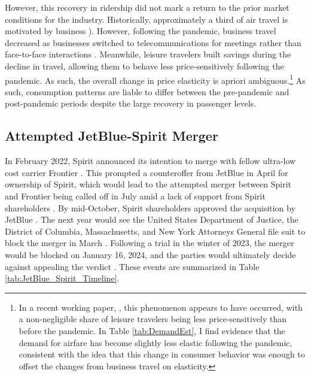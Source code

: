 \documentclass{article}
\begin{document}
	However, this recovery in ridership did not mark a return to the prior market conditions for the industry. Historically, approximately a third of air travel is motivated by business \citep{berry_tracing_2010, bet_market_2021}). However, following the pandemic, business travel decreased as businesses switched to telecommunications for meetings rather than face-to-face interactions \citep{semuels_business_2021}. Meanwhile, leisure travelers built savings during the decline in travel, allowing them to behave less price-sensitively following the pandemic. As such, the overall change in price elasticity is apriori ambiguous.\footnote{In a recent working paper, \citet{ewen_zoom_2023}, this phenomenon appears to have occurred, with a non-negligible share of leisure travelers being less price-sensitively than before the pandemic. In Table \ref{tab:DemandEst}, I find evidence that the demand for airfare has become slightly less elastic following the pandemic, consistent with the idea that this change in consumer behavior was enough to offset the changes from business travel on elasticity.}  As such, consumption patterns are liable to differ between the pre-pandemic and post-pandemic periods despite the large recovery in passenger levels. 

    
	\subsection{Attempted JetBlue-Spirit Merger}
	\label{sec:Setting_Merger}
	In February 2022, Spirit announced its intention to merge with fellow ultra-low cost carrier Frontier \citep{schaper_frontier-spirit_2022}. This prompted a counteroffer from JetBlue in April for ownership of Spirit, which would lead to the attempted merger between Spirit and Frontier being called off in July amid a lack of support from Spirit shareholders \citep{josephs_jetblue_2022, josephs_spirit_2022}. By mid-October, Spirit shareholders approved the acquisition by JetBlue \citep{koenig_spirit_2022}. The next year would see the United States Department of Justice, the District of Columbia, Massachusetts, and New York Attorneys General file suit to block the merger in March \citep{chokshi_justice_2023}. Following a trial in the winter of 2023, the merger would be blocked on January 16, 2024, and the parties would ultimately decide against appealing the verdict \citep{chapman_jetblue_2024}.  These events are summarized in Table \ref{tab:JetBlue_Spirit_Timeline}. 
\end{document}

